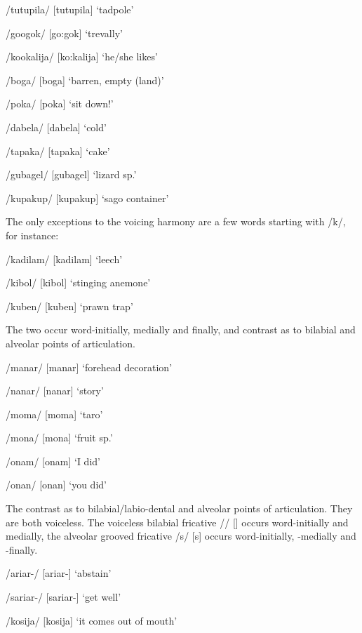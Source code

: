 /tutupila/  [tu{{\textprimstress}tupila}]  `tadpole'

/googok/  [{{\textprimstress}go:gok}]  `trevally'

/kookalija/  [{{\textprimstress}ko:kalija}]  `he/she likes'

/boga/  [bo{{\textprimstress}ga}]  `barren, empty (land)'

/poka/  [po{{\textprimstress}ka}]  `sit down!'

/dabela/  [da{{\textprimstress}bela}]  `cold'

/tapaka/  [ta{{\textprimstress}paka}]  `cake'

/gubagel/  [gu{{\textprimstress}bagel}]  `lizard sp.' 

/kupakup/  [ku{{\textprimstress}pakup}]  `sago container'

The only exceptions to the voicing harmony are a few words starting with /k/, for instance:

/kadilam/  [ka{{\textprimstress}dilam}]  `leech'

/kibol/  [ki{{\textprimstress}bol}]  `stinging anemone'

/kuben/  [ku{{\textprimstress}ben}]  `prawn trap'

The two  occur word-initially, medially and finally, and contrast as to bilabial and alveolar points of articulation. 

/manar/  [ma{{\textprimstress}nar}]  `forehead decoration'

/nanar/  [na{{\textprimstress}nar}]  `story'

/moma/  [mo{{\textprimstress}ma}]  `taro'

/mona/  [mo{{\textprimstress}na}]  `fruit sp.'

/onam/  [o{{\textprimstress}nam}]  `I did'

/onan/  [o{{\textprimstress}nan}]  `you did'

The  contrast as to bilabial/labio-dental and alveolar points of articulation. They are both voiceless. The voiceless bilabial fricative /{\textphi}/ [{\textphi}] occurs word-initially and medially, the alveolar grooved fricative /s/ [s] occurs word-initially, -medially and \nobreakdash-finally. 

/{\textphi}ariar-/  [{\textphi}a{{\textprimstress}riar}-]  `abstain'

/sariar-/  [sa{{\textprimstress}riar}-]  `get well'

/kosija/  [ko{{\textprimstress}sija}]  `it comes out of mouth'

